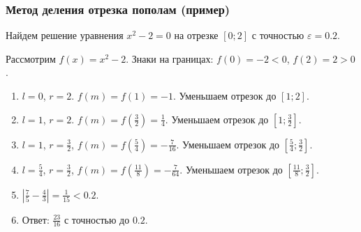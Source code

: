 \documentclass[10pt]{beamer}
\begin{document}
\begin{frame}[fragile]
\frametitle{Метод деления отрезка пополам (пример)}

Найдем решение уравнения $x^2 - 2 = 0$ на отрезке $[0; 2]$ с точностью $\varepsilon = 0.2$.

\begin{minipage}{0.4\linewidth}
\end{minipage}
\begin{minipage}{0.51\linewidth}
Рассмотрим $f(x) = x^2 - 2$. Знаки на границах: $f(0) = -2 < 0$, $f(2) = 2 > 0$.

\begin{enumerate}

\item $l = 0$, $r = 2$. $f(m) = f(1) = -1$. Уменьшаем отрезок до $[1; 2]$.

\item $l = 1$, $r = 2$. $f(m) = f\left(\frac{3}{2}\right) = \frac{1}{4}$. Уменьшаем отрезок до $\left[1; \frac{3}{2} \right]$.

\item $l = 1$, $r = \frac{3}{2}$, $f(m) = f\left(\frac{5}{4}\right) = - \frac{7}{16}$. Уменьшаем отрезок до $\left[\frac{5}{4}; \frac{3}{2} \right]$.

\item $l = \frac{5}{4}$, $r = \frac{3}{2}$, $f(m) = f\left(\frac{11}{8}\right) = - \frac{7}{64}$. Уменьшаем отрезок до $\left[\frac{11}{8}; \frac{3}{2} \right]$.

\item $\left| \frac{7}{5} - \frac{4}{3} \right| = \frac{1}{15} < 0.2$. 

\item Ответ: $\frac{23}{16}$ с точностью до $0.2$.

\end{enumerate}
\end{minipage}

\end{frame}
\end{document}
